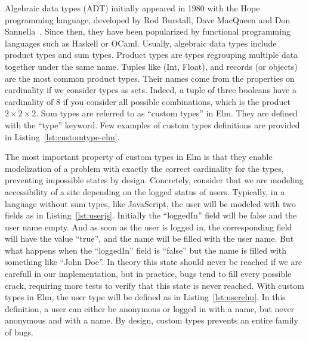 Algebraic data types (ADT) initially appeared in 1980 with the Hope programming language,
developed by Rod Burstall, Dave MacQueen and Don Sannella~\cite{burstall1980hope}.
Since then, they have been popularized by functional programming languages
such as Haskell or OCaml.
Usually, algebraic data types include product types and sum types.
Product types are types regrouping multiple data together under the same name.
Tuples like (Int, Float), and records (or objects) are the most common product types.
Their names come from the properties on cardinality if we consider types as sets.
Indeed, a tuple of three booleans have a cardinality of 8 if you consider
all possible combinations, which is the product $2\times2\times2$.
Sum types are referred to as ``custom types'' in Elm.
They are defined with the ``type'' keyword.
Few examples of custom types definitions are provided in Listing~\ref{lst:customtype-elm}.



The most important property of custom types in Elm
is that they enable modelization of a problem with exactly the correct
cardinality for the types, preventing impossible states by design.
Concretely, consider that we are modeling accessibility of a site
depending on the logged status of users.
Typically, in a language without sum types, like JavaScript,
the user will be modeled with two fields as in Listing~\ref{lst:userjs}.
Initially the ``loggedIn'' field will be false and the user name empty.
And as soon as the user is logged in,
the corresponding field will have the value ``true'',
and the name will be filled with the user name.
But what happens when the ``loggedIn'' field is ``false'' but
the name is filled with something like ``John Doe''.
In theory this state should never be reached if we are carefull in our implementation,
but in practice, bugs tend to fill every possible crack,
requiring more tests to verify that this state is never reached.
With custom types in Elm, the user type will be defined as in Listing~\ref{lst:userelm}.
In this definition, a user can either be anonymous or logged in with a name,
but never anonymous and with a name.
By design, custom types prevents an entire family of bugs.



